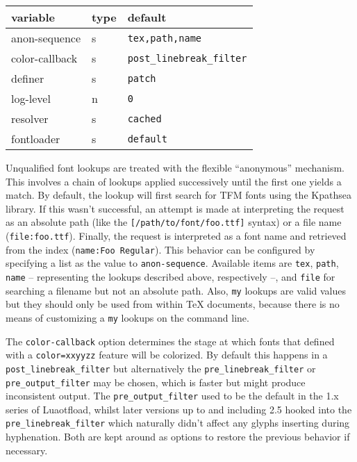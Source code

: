 \documentclass[a4paper]{article}
\newlength{\DUtablewidth} %
\begin{document}
\setlength{\DUtablewidth}{\linewidth}
\begin{longtable*}[c]{|p{0.226\DUtablewidth}|p{0.110\DUtablewidth}|p{0.365\DUtablewidth}|}
\hline

variable
 & 
type
 & 
default
 \\
\hline

anon-sequence
 & 
s
 & 
\texttt{\textquotedbl{}tex,path,name\textquotedbl{}}
 \\
\hline

color-callback
 & 
s
 & 
\texttt{\textquotedbl{}post\_linebreak\_filter\textquotedbl{}}
 \\
\hline

definer
 & 
s
 & 
\texttt{\textquotedbl{}patch\textquotedbl{}}
 \\
\hline

log-level
 & 
n
 & 
\texttt{0}
 \\
\hline

resolver
 & 
s
 & 
\texttt{\textquotedbl{}cached\textquotedbl{}}
 \\
\hline

fontloader
 & 
s
 & 
\texttt{\textquotedbl{}default\textquotedbl{}}
 \\
\hline
\end{longtable*}

Unqualified font lookups are treated with the flexible “anonymous”
mechanism. This involves a chain of lookups applied successively until
the first one yields a match. By default, the lookup will first search
for TFM fonts using the Kpathsea library. If this wasn’t successful, an
attempt is made at interpreting the request as an absolute path (like
the \texttt{{[}/path/to/font/foo.ttf{]}} syntax) or a file name
(\texttt{file:foo.ttf}). Finally, the request is interpreted as a font name
and retrieved from the index (\texttt{name:Foo Regular}). This behavior can
be configured by specifying a list as the value to \texttt{anon-sequence}.
Available items are \texttt{tex}, \texttt{path}, \texttt{name} -- representing the
lookups described above, respectively --, and \texttt{file} for searching a
filename but not an absolute path. Also, \texttt{my} lookups are valid
values but they should only be used from within TeX documents, because
there is no means of customizing a \texttt{my} lookups on the command line.

The \texttt{color-callback} option determines the stage at which fonts that
defined with a \texttt{color=xxyyzz} feature will be colorized. By default
this happens in a \texttt{post\_linebreak\_filter} but alternatively the
\texttt{pre\_linebreak\_filter} or \texttt{pre\_output\_filter} may be chosen, which
is faster but might produce inconsistent output. The
\texttt{pre\_output\_filter} used to be the default in the 1.x series of
Luaotfload, whilst later versions up to and including 2.5 hooked into
the \texttt{pre\_linebreak\_filter} which naturally didn’t affect any glyphs
inserting during hyphenation. Both are kept around as options to
restore the previous behavior if necessary.
\end{document}
